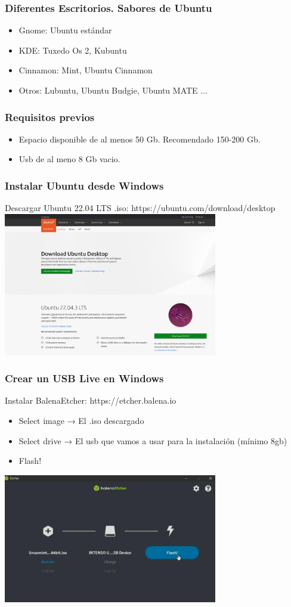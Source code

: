 \documentclass[10pt]{beamer}
\begin{document}
	\begin{frame}
		\frametitle{Diferentes Escritorios. Sabores de Ubuntu}
		\begin{itemize}
			\item Gnome: Ubuntu estándar
			\item KDE: Tuxedo Os 2, Kubuntu
			\item Cinnamon: Mint, 
			Ubuntu Cinnamon
			\item Otros: Lubuntu, Ubuntu Budgie, 
			Ubuntu MATE ...
		\end{itemize}
	\end{frame}
	
	\begin{frame}
		\frametitle{Requisitos previos}
		\begin{itemize}
			\item Espacio disponible de al menos 50 Gb. Recomendado 150-200 Gb.
			\item  Usb de al meno 8 Gb vacio.
		\end{itemize}
	\end{frame}
	
	\begin{frame}
		\frametitle{Instalar Ubuntu desde Windows}
		Descargar Ubuntu 22.04 LTS .iso: https://ubuntu.com/download/desktop\\
		\includegraphics[width=0.7\textwidth]{ubuntu}
	\end{frame}
	
	\begin{frame}
		\frametitle{Crear un USB Live en Windows}
		Instalar BalenaEtcher: https://etcher.balena.io\\
		\begin{itemize}
			\item Select image → El .iso descargado
			\item Select drive → El usb que vamos a usar para la instalación (mínimo 8gb)
			\item Flash!
		\end{itemize}
		\includegraphics[width=0.7\textwidth]{balena}
	\end{frame}
	
\end{document}
